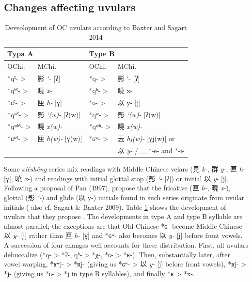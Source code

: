 \documentclass[xetex, svgnames, 12pt]{scrartcl}
\newcounter{para}
\begin{document}
\subsection{Changes affecting uvulars}

\begin{table}
\label{tab:BSUvulars}
\centering
\caption{Deveolopment of OC uvulars according to Baxter and Sagart 2014 }
\begin{tabular}[]{|ll|ll|} 
\hline
\multicolumn{2}{|l|}{Typa A}  &  \multicolumn{2}{|l|}{Type B}    \\ 
\hline
OChi. & MChi. & OChi. & MChi.   \\ 
\hline
*qˤ- > & 影 \textit{`-}  [ʔ]  & *q- > &  影 `- [ʔ] \\ 
*qʰˤ- > & 曉 \textit{x-} &  *qʰ- > & 曉 x-  \\
*ɢˤ- > & 匣 \textit{h-} [ɣ] & *ɢ- > & 以 y- [j] \\
*qʷˤ- > & 影 \textit{`(w)-} [ʔ(w)] & *qʷ- > & 影 \textit{`(w)-} [ʔ(w)] \\
*qʷʰˤ- > & 曉 \textit{x(w)-} & *qʷʰ- > & 曉 \textit{x(w)-} \\
*ɢʷˤ- > & 匣 \textit{h(w)-} [ɣ(w)] &
*ɢʷ- > &
 云 \textit{hj(w)-} [ɣj(w)] or \\ 
&&& 以 \textit{y-} /\_\_*-e- and *-i- \\
\hline
\end{tabular}
\end{table}

Some \textit{xiéshēng} series mix readings with Middle Chinese velars (見 \textit{k-}, 群 \textit{g-}, 匣 \textit{h-} [ɣ], 曉 \textit{x-}) and readings with initial glottal stop (影 \textit{`-}  [ʔ]) or initial 以 \textit{y}- [j]. Following a proposal of Pan (1997), 
\citeauthor{Baxter2014OldChinese}
propose that the fricative (匣 \textit{h-}, 曉 \textit{x-}), glottal (影 \textit{`-}) and glide (以 y-) initials found in such series originate from uvular initials (\citeyear[43-46]{Baxter2014OldChinese} also cf. Sagart \& Baxter 2009).
Table \ref{tab:BSUvulars} shows the development of uvulars that they propose \citet[46]{Baxter2014OldChinese}. The developments in type A and type B syllable are almost parallel; the exceptions are that Old Chinese *ɢ- become Middle Chinese 以 \textit{y-} [j] rather than 匣 \textit{h-} [ɣ] and *ɢʷ- also becomes 以 \textit{y-}  [j] before front vowels. A succession of four changes well accounts for these distribution. First, all uvulars debuccalize (*q- > *ʔ-, qʰ- > *χ-, *ɢ- > *ʁ-). Then, substantially later, after vowel warping, *ʁʷj- > *ʁj- (giving us *ɢʷ- > 以 \textit{y-} [j] before front vowels), *ʁj- > *j- (giving us *ɢ- > *j in type B syllables), and finally *ʁ > *x-.  
\end{document}

